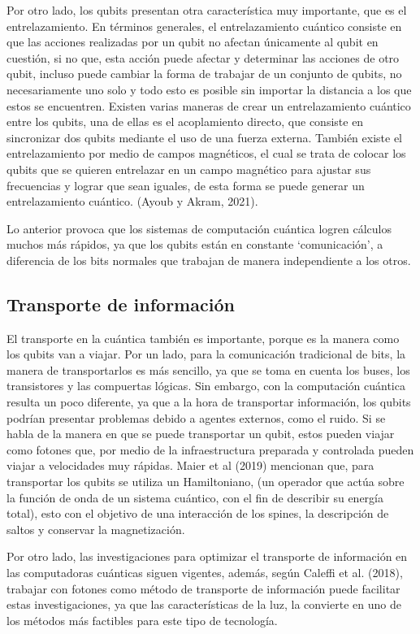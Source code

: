 \documentclass[twoside]{article}
\begin{document}
Por otro lado, los qubits presentan otra característica muy importante, que es el entrelazamiento. En términos generales, el entrelazamiento cuántico consiste en que las acciones realizadas por un qubit no afectan únicamente al qubit en cuestión, si no que, esta acción puede afectar y determinar las acciones de otro qubit, incluso puede cambiar la forma de trabajar de un conjunto de qubits, no necesariamente uno solo y todo esto es posible sin importar la distancia a los que estos se encuentren. 
Existen varias maneras de crear un entrelazamiento cuántico entre los qubits, una de ellas es el acoplamiento directo, que consiste en sincronizar dos qubits mediante el uso de una fuerza externa. También existe el entrelazamiento por medio de campos magnéticos, el cual se trata de colocar los qubits que se quieren entrelazar en un campo magnético para ajustar sus frecuencias y lograr que sean iguales, de esta forma se puede generar un entrelazamiento cuántico. (Ayoub y Akram, 2021).

Lo anterior provoca que los sistemas de computación cuántica logren cálculos muchos más rápidos, ya que los qubits están en constante ‘comunicación’, a diferencia de los bits normales que trabajan de manera independiente a los otros. 

\subsection{Transporte de información}
El transporte en la cuántica también es importante, porque es la manera como los qubits van a viajar. Por un lado, para la comunicación tradicional de bits, la manera de transportarlos es más sencillo, ya que se toma en cuenta los buses, los transistores y las compuertas lógicas. Sin embargo, con la computación cuántica resulta un poco diferente, ya que a la hora de transportar información, los qubits podrían presentar problemas debido a agentes externos, como el ruido.
Si se habla de la manera en que se puede transportar un qubit, estos pueden viajar como fotones que, por medio de la infraestructura preparada y controlada pueden viajar a velocidades muy rápidas. Maier et al (2019) mencionan que, para transportar los qubits se utiliza un Hamiltoniano, (un operador que actúa sobre la función de onda de un sistema cuántico, con el fin de describir su energía total), esto con el objetivo de una interacción de los spines, la descripción de saltos y conservar la magnetización.

Por otro lado, las investigaciones para optimizar el transporte de información en las computadoras cuánticas siguen vigentes, además, según Caleffi et al. (2018), trabajar con fotones como método de transporte de información puede facilitar estas investigaciones, ya que las características de la luz, la convierte en uno de los métodos más factibles para este tipo de tecnología.
\end{document}
